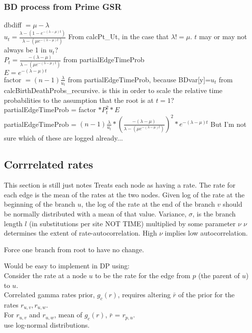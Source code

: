 \documentclass{llncs}
\newcommand{\ejmcomment}[1]{{\color{green} #1}}
\begin{document}
\subsubsection{BD process from Prime GSR\\}

dbdiff $= \mu - \lambda$\\
$u_t =\frac{\lambda-(1-e^{-(\lambda-\mu)t})}{\lambda-(\mu e^{-(\lambda - \mu)t})}$ From calcPt\_Ut, in the case that $\lambda != \mu$. \ejmcomment{$t$ may or may not always be 1 in $u_t$?}\\
$P_t = \frac{-(\lambda-\mu)}{\lambda-(\mu e^{-(\lambda - \mu)t})}$ from partialEdgeTimeProb\\
$E=e^{-(\lambda-\mu)t}$\\
factor $= (n-1)\frac{\lambda}{u_t}$ from partialEdgeTimeProb, because BDvar[y]=$u_t$ from calcBirthDeathProbs\_recursive. 
\ejmcomment{is this in order to scale the relative time probabilities to the assumption that the root is at $t=1$?}\\
partialEdgeTimeProb = factor $*P_t^2 *E$\\
partialEdgeTimeProb = $(n-1)\frac{\lambda}{u_t} * ( \frac{-(\lambda-\mu)}{\lambda-(\mu e^{-(\lambda - \mu)t})})^2 * e^{-(\lambda-\mu)t}$\ejmcomment{But I'm not sure which of these are logged already...}\\

\subsection{Corrrelated rates \cite{Kishino2001}}\ejmcomment{This section is still just notes}
Treats each node as having a rate.
The rate for each edge is the mean of the rates at the two nodes.
Given log  of the rate at the beginning of the branch $u$, the log of the rate at the end of the branch $v$ should be normally distributed with a mean of that value.
Variance, $\sigma$, is the branch length $l$ (in substitutions per site NOT TIME) multiplied by some parameter $\nu$
$\nu$ determines the extent of rate-autocorrelation. High $\nu$ implies low autocorrelation. 

Force one branch from root to have no change.


Would be easy to implement in DP using:\\
Consider the rate at a node $u$ to be the rate for the edge from $p$ (the parent of $u$) to $u$.\\
Correlated gamma rates prior, $g_c(r)$, requires altering $\bar{r}$ of the prior for the rates $r_{u,v}, r_{u,w}$.\\
For $r_{u,v}$ and $r_{u,w}$, mean of $g_c(r)$, $\bar{r}$ = $r_{p,u}$.\\
\cite{Kishino2001} use log-normal distributions.\\





\end{document}
